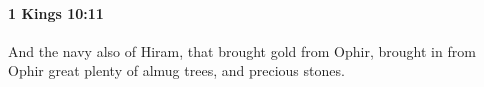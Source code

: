 
		\paragraph{1 Kings 10:11} %
			\label{1KINGS-10-11}

			And the navy also of Hiram, that brought gold from Ophir, brought in from Ophir great plenty of almug trees, and precious stones.


